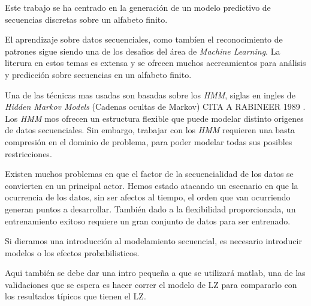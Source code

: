 


Este trabajo se ha centrado en la generación de un modelo predictivo de secuencias discretas sobre un alfabeto finito.

El aprendizaje sobre datos secuenciales, como tambíen el reconocimiento de patrones sigue siendo una de los desafios del área de \emph{Machine Learning}.
La literura en estos temas es extensa y se ofrecen muchos acercamientos para análisis y predicción sobre secuencias en un alfabeto finito.

Una de las técnicas mas usadas son basadas sobre los \emph{HMM}, siglas en ingles de \emph{Hidden Markov Models} (Cadenas ocultas de Markov) CITA A RABINEER 1989 . Los \emph{HMM} mos ofrecen un estructura flexible que puede modelar distinto origenes de datos secuenciales. Sin embargo, trabajar con los \emph{HMM} requieren una basta compresión en el dominio de problema, para poder modelar todas sus posibles restricciones.


Existen muchos problemas en que el factor de la secuencialidad de los datos se convierten en un principal actor. Hemos estado atacando un escenario en que la ocurrencia de los datos, sin ser afectos al tiempo, el orden que van ocurriendo generan puntos a desarrollar. También dado a la flexibilidad proporcionada, un entrenamiento exitoso requiere un gran conjunto de datos para ser entrenado.

 




Si dieramos una introducción al modelamiento secuencial, es necesario introducir modelos o los efectos probabilisticos.



Aqui también se debe dar una intro pequeña a que se utilizará matlab, una de las validaciones que se espera es hacer correr el modelo de LZ para compararlo con los resultados típicos que tienen el LZ.



